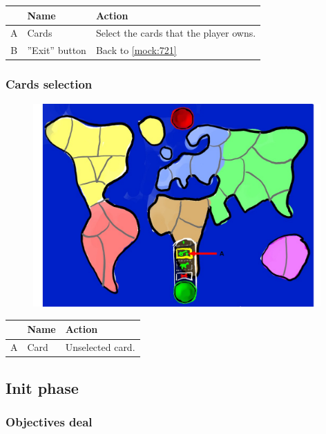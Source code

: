 \documentclass[12pt,a4paper]{article}
\begin{document}
\begin{table}[H]
\small
\centering
\begin{tabular}{c|p{5cm}|p{7cm}}
& Name & Action \\ \hline\hline
A
&Cards
&Select the cards that the player owns.
\\B
&''Exit'' button
&Back to \ref{mock:721}
\end{tabular}
\end{table}

\newpage
\subsubsection{Cards selection}\label{mock:724}

\begin{figure}[H]
  \centering
  \includegraphics[width=11cm]{pic/mocks/2-4.pdf}
\end{figure}

\begin{table}[H]
\small
\centering
\begin{tabular}{c|p{5cm}|p{7cm}}
& Name & Action \\ \hline\hline
A
&Card
&Unselected card.
\end{tabular}
\end{table}


\subsection{Init phase}\label{mock:73}

\subsubsection{Objectives deal}\label{mock:731}
\end{document}
